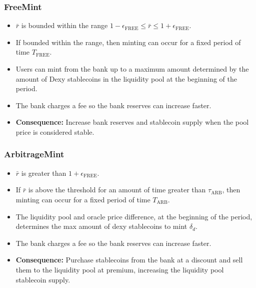 \documentclass{ifcolog}
\newcommand{\rr}{\bar{r}}
\begin{document}
\subsubsection{FreeMint}
  \begin{itemize}
    \item $\rr$ is bounded within the range $1- \epsilon_{\textrm{FREE}} \le \rr \le 1+ \epsilon_{\textrm{FREE}}$.
    \item If bounded within the range, then minting can occur for a fixed period of time $T_{\textrm{FREE}}$.
    \item Users can mint from the bank up to a maximum amount determined by the amount of Dexy stablecoins in the liquidity pool at the beginning of the period.
    \item The bank charges a fee so the bank reserves can increase faster.
    \item \textbf{Consequence:} Increase bank reserves and stablecoin supply when the pool price is considered stable.
  \end{itemize}
  
\subsubsection{ArbitrageMint}
  \begin{itemize}
    \item $\rr$ is greater than $1 + \epsilon_{\textrm{FREE}}$.
    \item If $\rr$ is above the threshold for an amount of time greater than $\tau_{\textrm{ARB}}$,
          then minting can occur for a fixed period of time $T_{\textrm{ARB}}$.
    \item The liquidity pool and oracle price difference, at the beginning of the period, determines the max amount of dexy stablecoins to mint $\delta_{d}$.
    \item The bank charges a fee so the bank reserves can increase faster.
    \item \textbf{Consequence:} Purchase stablecoins from the bank at a discount and sell them to the liquidity pool at premium, 
    increasing the liquidity pool stablecoin supply.
  \end{itemize}
\end{document}
